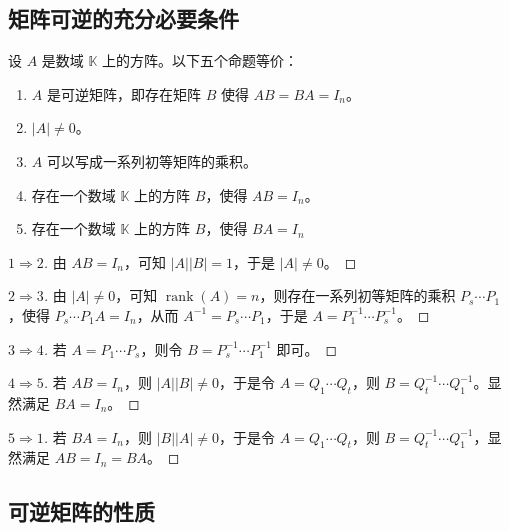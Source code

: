 \subsection{矩阵可逆的充分必要条件}

\begin{theorem}[矩阵可逆的充分必要条件]
	设 $A$ 是数域 $\mathbb K$ 上的方阵。以下五个命题等价：
	\begin{enumerate}
		\item $A$ 是可逆矩阵，即存在矩阵 $B$ 使得 $AB = BA = I_n$。
		\item $|A| \ne 0$。
		\item $A$ 可以写成一系列初等矩阵的乘积。
		\item 存在一个数域 $\mathbb K$ 上的方阵 $B$，使得 $AB = I_n$。
		\item 存在一个数域 $\mathbb K$ 上的方阵 $B$，使得 $BA = I_n$
	\end{enumerate}
\end{theorem}

\begin{proof}[$1 \Longrightarrow 2$]
	由 $AB = I_n$，可知 $|A| |B| = 1$，于是 $|A| \ne 0$。
\end{proof}

\begin{proof}[$2 \Longrightarrow 3$]
	由 $|A| \ne 0$，可知 $\operatorname{rank}(A) = n$，则存在一系列初等矩阵的乘积 $P_s \cdots P_1$，使得 $P_s \cdots P_1 A = I_n$，从而 $A^{-1} = P_s \cdots P_1$，于是 $A = P_1^{-1} \cdots P_s^{-1}$。
\end{proof}

\begin{proof}[$3 \Longrightarrow 4$]
	若 $A = P_1 \cdots P_s$，则令 $B = P_s^{-1} \cdots P_1^{-1}$ 即可。
\end{proof}

\begin{proof}[$4 \Longrightarrow 5$]
	若 $AB = I_n$，则 $|A||B| \ne 0$，于是令 $A = Q_1 \cdots Q_t$，则 $B = Q_t^{-1} \cdots Q_1^{-1}$。显然满足 $BA = I_n$。
\end{proof}

\begin{proof}[$5 \Longrightarrow 1$]
	若 $BA = I_n$，则 $|B||A| \ne 0$，于是令 $A = Q_1 \cdots Q_t$，则 $B = Q_t^{-1} \cdots Q_1^{-1}$，显然满足 $AB = I_n = BA$。
\end{proof}

\subsection{可逆矩阵的性质}

